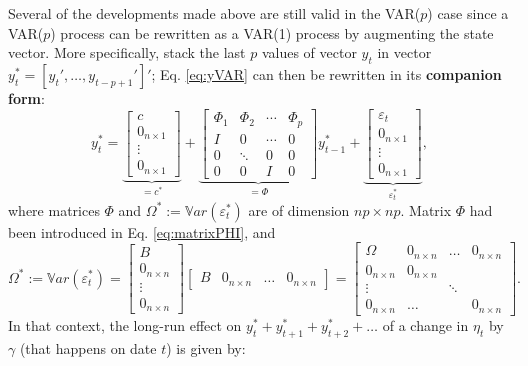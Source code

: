 \documentclass[
  11pt,
]{book}
\theoremstyle{definition}
\theoremstyle{definition}
\theoremstyle{definition}
\theoremstyle{definition}
\theoremstyle{remark}
\begin{document}
Several of the developments made above are still valid in the VAR(\(p\)) case since a VAR(\(p\)) process can be rewritten as a VAR(1) process by augmenting the state vector. More specifically, stack the last \(p\) values of vector \(y_t\) in vector \(y_{t}^{*}=[y_t',\dots,y_{t-p+1}']'\); Eq. \eqref{eq:yVAR} can then be rewritten in its \textbf{companion form}:
\begin{equation}
y_{t}^{*} =
\underbrace{\left[\begin{array}{c}
c\\
0_{n \times 1}\\
\vdots\\
0_{n \times 1}\end{array}\right]}_{=c^*}+
\underbrace{\left[\begin{array}{cccc}
\Phi_{1} & \Phi_{2} & \cdots & \Phi_{p}\\
I & 0 & \cdots & 0\\
0 & \ddots & 0 & 0\\
0 & 0 & I & 0\end{array}\right]}_{=\Phi}
y_{t-1}^{*}+
\underbrace{\left[\begin{array}{c}
\varepsilon_{t}\\
0_{n \times 1}\\
\vdots\\
0_{n \times 1}\end{array}\right]}_{\varepsilon_t^*},\label{eq:ystarVAR}
\end{equation}
where matrices \(\Phi\) and \(\Omega^*:= \mathbb{V}ar(\varepsilon_t^*)\) are of dimension \(np \times np\). Matrix \(\Phi\) had been introduced in Eq. \eqref{eq:matrixPHI}, and
\[
\Omega^* := \mathbb{V}ar(\varepsilon_t^*)=
\left[\begin{array}{c}
B \\
0_{n \times n}  \\
\vdots \\
0_{n \times n}
\end{array}\right]\left[\begin{array}{cccc}
B & 0_{n \times n} & \dots & 0_{n \times n}
\end{array}\right]
= \left[\begin{array}{cccc}
\Omega & 0_{n \times n} & \dots & 0_{n \times n} \\
0_{n \times n} & 0_{n \times n} \\
\vdots &&\ddots\\
0_{n \times n} & \dots &&0_{n \times n}
\end{array}\right].
\]
In that context, the long-run effect on \(y_t^*+y_{t+1}^*+y_{t+2}^*+\dots\) of a change in \(\eta_t\) by \(\gamma\) (that happens on date \(t\)) is given by:
\end{document}
